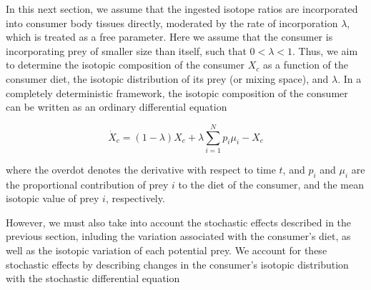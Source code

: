 \documentclass{frontiersSCNS}
\begin{document}
In this next section, we assume that the ingested isotope ratios are incorporated into consumer body tissues directly, moderated by the rate of incorporation $\lambda$, which is treated as a free parameter.
Here we assume that the consumer is incorporating prey of smaller size than itself, such that $ 0 < \lambda < 1$.
Thus, we aim to determine the isotopic composition of the consumer $X_c$ as a function of the consumer diet, the isotopic distribution of its prey (or mixing space), and $\lambda$.
In a completely deterministic framework, the isotopic composition of the consumer can be written as an ordinary differential equation

\begin{equation}
\label{eqODE}
\dot X_c = (1-\lambda)X_c + \lambda \sum_{i=1}^N p_i \mu_i - X_c
\end{equation}

\noindent where the overdot denotes the derivative with respect to time $t$, and $p_i$ and $\mu_i$ are the proportional contribution of prey $i$ to the diet of the consumer, and the mean isotopic value of prey $i$, respectively.

However, we must also take into account the stochastic effects described in the previous section, inluding the variation associated with the consumer's diet, as well as the isotopic variation of each potential prey.
We account for these stochastic effects by describing changes in the consumer's isotopic distribution with the stochastic differential equation
\end{document}
